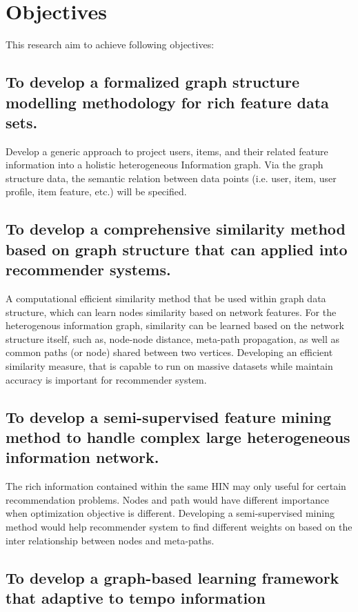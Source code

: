 \documentclass[12pt,a4 paper,title page]{article}
\begin{document}
\section{Objectives}
This research aim to achieve following objectives: 

\subsection{To develop a formalized graph structure modelling methodology for rich feature data sets.  }

Develop a generic approach to project users, items, and their related feature information into a holistic heterogeneous Information graph. Via the graph structure data, the semantic relation between data points (i.e. user, item, user profile, item feature, etc.) will be specified.

\subsection{To develop a comprehensive similarity method based on graph structure that can applied into recommender systems. } 

A computational efficient similarity method that be used within graph data structure, which can learn nodes similarity based on network features. For the heterogenous information graph, similarity can be learned based on the network structure itself, such as, node-node distance, meta-path propagation, as well as common paths (or node) shared between two vertices. Developing an efficient similarity measure, that is capable to run on massive datasets while maintain accuracy is important for recommender system. 

\subsection{To develop a semi-supervised feature mining method to handle complex large heterogeneous information network.}

The rich information contained within the same HIN may only useful for certain recommendation problems. Nodes and path would have different importance when optimization objective is different. Developing a semi-supervised mining method would help recommender system to find different weights on based on the inter relationship between nodes and meta-paths. 

\subsection{To develop a graph-based learning framework that adaptive to tempo information}
\end{document}
